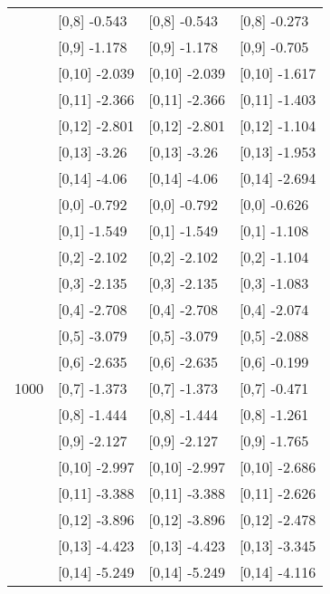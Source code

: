 \begin{table}
\begin{tabular}[t]{llll}
 & {}[0,8] -0.543 & {}[0,8] -0.543 & {}[0,8] -0.273\\
 & {}[0,9] -1.178 & {}[0,9] -1.178 & {}[0,9] -0.705\\
\addlinespace
 & {}[0,10] -2.039 & {}[0,10] -2.039 & {}[0,10] -1.617\\
 & {}[0,11] -2.366 & {}[0,11] -2.366 & {}[0,11] -1.403\\
 & {}[0,12] -2.801 & {}[0,12] -2.801 & {}[0,12] -1.104\\
 & {}[0,13] -3.26 & {}[0,13] -3.26 & {}[0,13] -1.953\\
 & {}[0,14] -4.06 & {}[0,14] -4.06 & {}[0,14] -2.694\\
\addlinespace
 & {}[0,0] -0.792 & {}[0,0] -0.792 & {}[0,0] -0.626\\
 & {}[0,1] -1.549 & {}[0,1] -1.549 & {}[0,1] -1.108\\
 & {}[0,2] -2.102 & {}[0,2] -2.102 & {}[0,2] -1.104\\
 & {}[0,3] -2.135 & {}[0,3] -2.135 & {}[0,3] -1.083\\
 & {}[0,4] -2.708 & {}[0,4] -2.708 & {}[0,4] -2.074\\
\addlinespace
 & {}[0,5] -3.079 & {}[0,5] -3.079 & {}[0,5] -2.088\\
 & {}[0,6] -2.635 & {}[0,6] -2.635 & {}[0,6] -0.199\\
1000 & {}[0,7] -1.373 & {}[0,7] -1.373 & {}[0,7] -0.471\\
 & {}[0,8] -1.444 & {}[0,8] -1.444 & {}[0,8] -1.261\\
 & {}[0,9] -2.127 & {}[0,9] -2.127 & {}[0,9] -1.765\\
\addlinespace
 & {}[0,10] -2.997 & {}[0,10] -2.997 & {}[0,10] -2.686\\
 & {}[0,11] -3.388 & {}[0,11] -3.388 & {}[0,11] -2.626\\
 & {}[0,12] -3.896 & {}[0,12] -3.896 & {}[0,12] -2.478\\
 & {}[0,13] -4.423 & {}[0,13] -4.423 & {}[0,13] -3.345\\
 & {}[0,14] -5.249 & {}[0,14] -5.249 & {}[0,14] -4.116\\
\bottomrule
\end{tabular}
\end{table}
